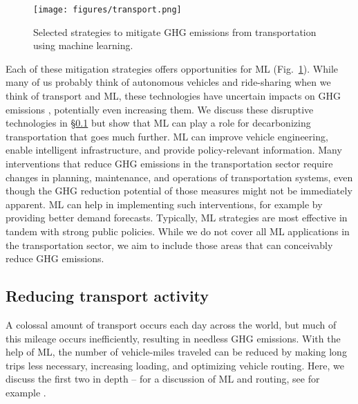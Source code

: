 \documentclass[11pt]{report}
\begin{document}
\begin{figure}[tb]
    \centering
    \texttt{[image: figures/transport.png]}
    \caption{Selected strategies to mitigate GHG emissions from transportation using machine learning.}
    \label{fig:transport}
\end{figure}
Each of these mitigation strategies offers opportunities for ML (Fig.~\ref{fig:transport}).  
While many of us probably think of autonomous vehicles and ride-sharing when we think of transport and ML, these technologies have uncertain impacts on GHG emissions \cite{WADUD20161}, potentially even increasing them. 
We discuss these disruptive technologies in \S\ref{sec:TReducing} but show that ML can play a role for decarbonizing transportation that goes much further. 
ML can improve vehicle engineering, enable intelligent infrastructure, and provide policy-relevant information. 
Many interventions that reduce GHG emissions in the transportation sector require changes in planning, maintenance, and operations of transportation systems, even though the GHG reduction potential of those measures might not be immediately apparent. ML can help in implementing such interventions, for example by providing better demand forecasts. Typically, ML strategies are most effective in tandem with strong public policies.  
While we do not cover all ML applications in the transportation sector, we aim to include those areas that can conceivably reduce GHG emissions. 

\subsection{Reducing transport activity}\label{sec:TReducing}


A colossal amount of transport occurs each day across the world, but much of this mileage occurs inefficiently, resulting in needless GHG emissions. With the help of ML, the number of vehicle-miles traveled can be reduced by making long trips less necessary, increasing loading, and optimizing vehicle routing. Here, we discuss the first two in depth -- for a discussion of ML and routing, see for example \cite{ZENG2017458}. 
\end{document}
